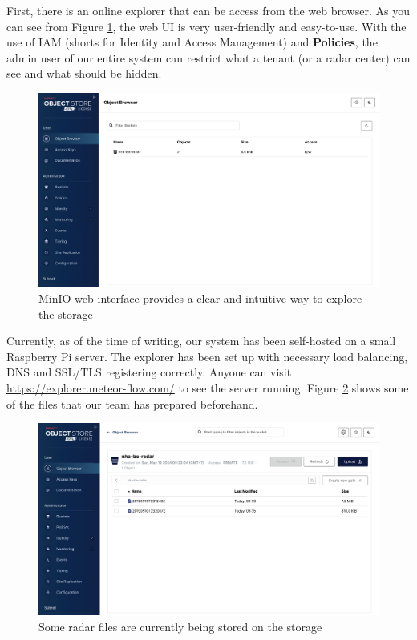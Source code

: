 First, there is an online explorer that can be access from the web browser. As
you can see from Figure \ref{fig:minio-home}, the web UI is very user-friendly
and easy-to-use. With the use of IAM (shorts for Identity and Access Management)
and \textbf{Policies}, the admin user of our entire system can restrict what a
tenant (or a radar center) can see and what should be hidden.

\begin{figure}[H]
    \centering
    \includegraphics[width=0.8\linewidth]{Images/4.3-datastore/minio-bucket.png}
    \vspace{1em}
    \caption{MinIO web interface provides a clear and intuitive way to explore the storage}
    \label{fig:minio-home}
\end{figure}

Currently, as of the time of writing, our system has been self-hosted on a small
Raspberry Pi server. The explorer has been set up with necessary load balancing,
DNS and SSL/TLS registering correctly. Anyone can visit
\url{https://explorer.meteor-flow.com/} to see the server running. Figure
\ref{fig:minio-files} shows some of the files that our team has prepared beforehand.

\begin{figure}[H]
    \centering
    \includegraphics[width=0.8\linewidth]{Images/4.3-datastore/minio-files.png}
    \vspace{1em}
    \caption{Some radar files are currently being stored on the storage}
    \label{fig:minio-files}
\end{figure}


